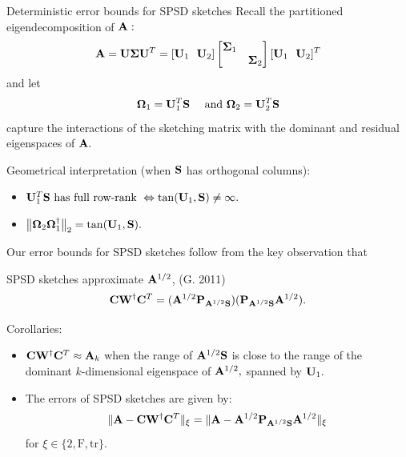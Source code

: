 \documentclass[xcolor=x11names,compress,ignorenonframetext,10pt]{beamer}
\renewcommand{\(}{\begin{columns}}
\renewcommand{\)}{\end{columns}}
\newcommand{\<}[1]{\begin{column}{#1}}
\renewcommand{\>}{\end{column}}
\def\refcolor{DodgerBlue4}
\newcommand{\refer}[1]{({\color{\refcolor}#1})}
\begin{document}
\begin{frame}{Deterministic error bounds for SPSD sketches}
 Recall the partitioned eigendecomposition of $\mathbf{A}:$
  \[ \mathbf{A} = \mathbf{U} \boldsymbol{\Sigma} \mathbf{U}^T = [\mathbf{U}_1 \ \ \mathbf{U}_2] 
  \left[\begin{matrix} \boldsymbol{\Sigma}_1 & \\ & \boldsymbol{\Sigma}_2 \end{matrix} \right] 
  [\mathbf{U}_1 \ \ \mathbf{U}_2]^T
  \]
  and let
 \[
  \boldsymbol{\Omega}_1 = \mathbf{U}_1^T \mathbf{S} \quad \text{ and } \boldsymbol{\Omega}_2 = \mathbf{U}_2^T \mathbf{S}
 \]
 capture the interactions of the sketching matrix with the dominant and residual eigenspaces of $\mathbf{A}.$
 \vspace{1em}

 Geometrical interpretation (when $\mathbf{S}$ has orthogonal columns):
 \begin{itemize}
  \item $\mathbf{U}_1^T \mathbf{S} \text{ has full row-rank } \Leftrightarrow \tan(\mathbf{U}_1, \mathbf{S}) \neq \infty.$ 
  \item $\big\|\boldsymbol{\Omega}_2 \boldsymbol{\Omega}_1^\dagger\big\|_2 = \tan(\mathbf{U}_1, \mathbf{S}).$
 \end{itemize}
\end{frame}

\begin{frame}
 Our error bounds for SPSD sketches follow from the key observation that 
 \begin{block}{SPSD sketches approximate $\mathbf{A}^{1/2}$, \refer{G. 2011}}
  \[
   \mathbf{C}\mathbf{W}^\dagger \mathbf{C}^T = (\mathbf{A}^{1/2} \mathbf{P}_{\mathbf{A}^{1/2} \mathbf{S}}) (\mathbf{P}_{\mathbf{A}^{1/2} \mathbf{S}} \mathbf{A}^{1/2}).
  \]
 \end{block}
 
 Corollaries:
 \begin{itemize}
  \item $\mathbf{C}\mathbf{W}^\dagger \mathbf{C}^T \approx \mathbf{A}_k$ when the range of $\mathbf{A}^{1/2} \mathbf{S}$ is close to the 
 range of the dominant $k$-dimensional eigenspace of $\mathbf{A}^{1/2},$ spanned by $\mathbf{U}_1.$
 \item The errors of SPSD sketches are given by: 
 \[
   \|\mathbf{A} - \mathbf{C}\mathbf{W}^\dagger \mathbf{C}^T\|_\xi =
   \|\mathbf{A} - \mathbf{A}^{1/2} \mathbf{P}_{\mathbf{A}^{1/2} \mathbf{S}} \mathbf{A}^{1/2}\|_\xi
 \]
 for $\xi \in \{2, \mathrm{F}, \mathrm{tr}\}.$
 \end{itemize}
\end{frame}
\end{document}
